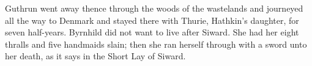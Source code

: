 \bpb Guthrun went away thence through the woods of the wastelands and journeyed all the way to Denmark and stayed there with Thurie, Hathkin’s daughter, for seven half-years.  Byrnhild did not want to live after Siward.  She had her eight thralls and five handmaids slain; then she ran herself through with a sword unto her death, as it says in the Short Lay of Siward.\epb\epg

\sectionline
